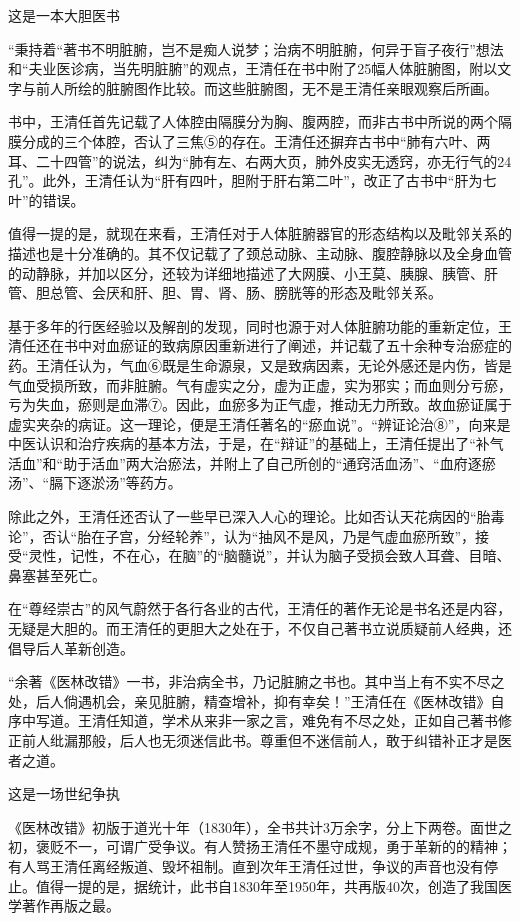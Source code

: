 \documentclass[a4paper,12pt,UTF8,twoside]{ctexbook}
\begin{document}
	这是一本大胆医书
	
	“秉持着“著书不明脏腑，岂不是痴人说梦；治病不明脏腑，何异于盲子夜行”想法和“夫业医诊病，当先明脏腑”的观点，王清任在书中附了25幅人体脏腑图，附以文字与前人所绘的脏腑图作比较。而这些脏腑图，无不是王清任亲眼观察后所画。
	
	书中，王清任首先记载了人体腔由隔膜分为胸、腹两腔，而非古书中所说的两个隔膜分成的三个体腔，否认了三焦⑤的存在。王清任还摒弃古书中“肺有六叶、两耳、二十四管”的说法，纠为“肺有左、右两大页，肺外皮实无透窍，亦无行气的24孔”。此外，王清任认为“肝有四叶，胆附于肝右第二叶”，改正了古书中“肝为七叶”的错误。
	
	值得一提的是，就现在来看，王清任对于人体脏腑器官的形态结构以及毗邻关系的描述也是十分准确的。其不仅记载了了颈总动脉、主动脉、腹腔静脉以及全身血管的动静脉，并加以区分，还较为详细地描述了大网膜、小王莫、胰腺、胰管、肝管、胆总管、会厌和肝、胆、胃、肾、肠、膀胱等的形态及毗邻关系。
	
	基于多年的行医经验以及解剖的发现，同时也源于对人体脏腑功能的重新定位，王清任还在书中对血瘀证的致病原因重新进行了阐述，并记载了五十余种专治瘀症的药。王清任认为，气血⑥既是生命源泉，又是致病因素，无论外感还是内伤，皆是气血受损所致，而非脏腑。气有虚实之分，虚为正虚，实为邪实；而血则分亏瘀，亏为失血，瘀则是血滞⑦。因此，血瘀多为正气虚，推动无力所致。故血瘀证属于虚实夹杂的病证。这一理论，便是王清任著名的“瘀血说”。“辨证论治⑧”，向来是中医认识和治疗疾病的基本方法，于是，在“辩证”的基础上，王清任提出了“补气活血”和“助于活血”两大治瘀法，并附上了自己所创的“通窍活血汤”、“血府逐瘀汤”、“膈下逐淤汤”等药方。
	
	除此之外，王清任还否认了一些早已深入人心的理论。比如否认天花病因的“胎毒论”，否认“胎在子宫，分经轮养”，认为“抽风不是风，乃是气虚血瘀所致”，接受“灵性，记性，不在心，在脑”的“脑髓说”，并认为脑子受损会致人耳聋、目暗、鼻塞甚至死亡。
	
	在“尊经崇古”的风气蔚然于各行各业的古代，王清任的著作无论是书名还是内容，无疑是大胆的。而王清任的更胆大之处在于，不仅自己著书立说质疑前人经典，还倡导后人革新创造。
	
	“余著《医林改错》一书，非治病全书，乃记脏腑之书也。其中当上有不实不尽之处，后人倘遇机会，亲见脏腑，精查增补，抑有幸矣！”王清任在《医林改错》自序中写道。王清任知道，学术从来非一家之言，难免有不尽之处，正如自己著书修正前人纰漏那般，后人也无须迷信此书。尊重但不迷信前人，敢于纠错补正才是医者之道。
	
	这是一场世纪争执
	
	《医林改错》初版于道光十年（1830年），全书共计3万余字，分上下两卷。面世之初，褒贬不一，可谓广受争议。有人赞扬王清任不墨守成规，勇于革新的的精神；有人骂王清任离经叛道、毁坏祖制。直到次年王清任过世，争议的声音也没有停止。值得一提的是，据统计，此书自1830年至1950年，共再版40次，创造了我国医学著作再版之最。
	
\end{document}

